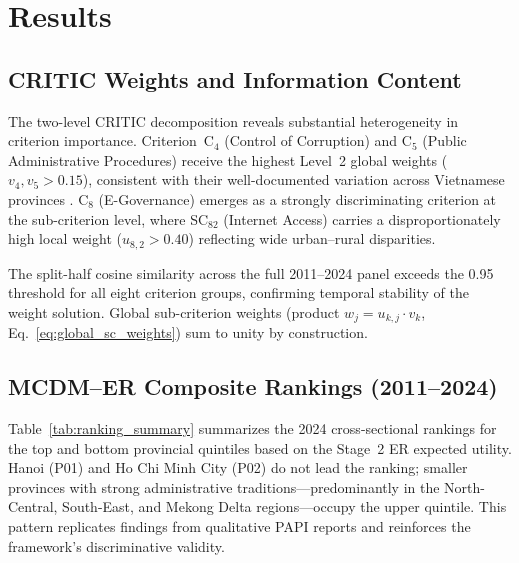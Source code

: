 \documentclass[12pt, a4paper]{article}
\begin{document}
\section{Results}

\subsection{CRITIC Weights and Information Content}

The two-level CRITIC decomposition reveals substantial heterogeneity in criterion
importance. Criterion~$\text{C}_4$ (Control of Corruption) and $\text{C}_5$
(Public Administrative Procedures) receive the highest Level~2 global weights
($v_4, v_5 > 0.15$), consistent with their well-documented variation across
Vietnamese provinces \citep{CECODES2023}. $\text{C}_8$ (E-Governance) emerges as
a strongly discriminating criterion at the sub-criterion level, where
SC$_{82}$ (Internet Access) carries a disproportionately high local weight
($u_{8,2} > 0.40$) reflecting wide urban--rural disparities.

The split-half cosine similarity across the full 2011--2024 panel exceeds the 0.95
threshold for all eight criterion groups, confirming temporal stability of the
weight solution. Global sub-criterion weights (product
$w_j = u_{k,j} \cdot v_k$, Eq.~\ref{eq:global_sc_weights}) sum to unity by
construction.

\subsection{MCDM--ER Composite Rankings (2011--2024)}

Table~\ref{tab:ranking_summary} summarizes the 2024 cross-sectional rankings for
the top and bottom provincial quintiles based on the Stage~2 ER expected utility.
Hanoi (P01) and Ho Chi Minh City (P02) do not lead the ranking; smaller provinces
with strong administrative traditions---predominantly in the North-Central, South-East,
and Mekong Delta regions---occupy the upper quintile. This pattern replicates
findings from qualitative PAPI reports and reinforces the framework's discriminative
validity.
\end{document}
